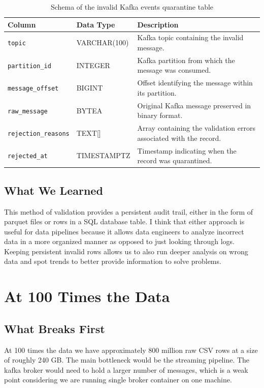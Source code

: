 \documentclass[11pt,letterpaper]{article}
\begin{document}
\begin{table}[htbp]
\centering
\caption{Schema of the invalid Kafka events quarantine table}
\label{tab:invalid_kafka_events}
\small
\begin{tabularx}{\linewidth}{|p{3.2cm}|p{3cm}|X|}
\hline
\textbf{Column} & \textbf{Data Type} & \textbf{Description} \\
\hline
\texttt{topic} &
VARCHAR(100) &
Kafka topic containing the invalid message. \\
\hline
\texttt{partition\_id} &
INTEGER &
Kafka partition from which the message was consumed. \\
\hline
\texttt{message\_offset} &
BIGINT &
Offset identifying the message within its partition. \\
\hline
\texttt{raw\_message} &
BYTEA &
Original Kafka message preserved in binary format. \\
\hline
\texttt{rejection\_reasons} &
TEXT[] &
Array containing the validation errors associated with the record. \\
\hline
\texttt{rejected\_at} &
TIMESTAMPTZ &
Timestamp indicating when the record was quarantined. \\
\hline
\end{tabularx}
\end{table}


\subsection{What We Learned}
This method of validation provides a persistent audit trail, either in the form of parquet files or rows in a SQL database table. I think that either approach is useful for data pipelines because it allows data engineers to analyze incorrect data in a more organized manner as opposed to just looking through logs. Keeping persistent invalid rows allows us to also run deeper analysis on wrong data and spot trends to better provide information to solve problems.

\section{At 100 Times the Data}

\subsection{What Breaks First}
At 100 times the data we have approximately 800 million raw CSV rows at a size of roughly 240 GB. The main bottleneck would be the streaming pipeline. The kafka broker would need to hold a larger number of messages, which is a weak point considering we are running single broker container on one machine.
\end{document}
